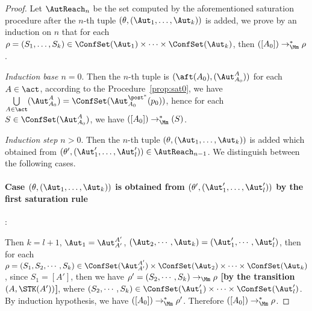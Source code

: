 \begin{proof}
    Let $\AutReach_n$ be the set computed by the aforementioned saturation procedure after the $n$-th tuple $(\theta,(\Aut_1,\dots,\Aut_k))$ is added, we prove by an induction on $n$ that for each $\rho = (S_1,\dots,S_k)\in\ConfSet(\Aut_1) \times \dots \times \ConfSet(\Aut_k)$, then $([A_0])\rightarrow_{\Mm}^*\rho$.

    \noindent \emph{Induction base $n = 0$}. Then the $n$-th tuple is $(\aft(A_0),(\Aut_{A_0}^{A}))$ for each $A\in\act$, according to the Procedure~\ref{prop:sat0}, we have $\bigcup\limits_{A\in\act}(\Aut_{A_0}^{A}) = \ConfSet(\Aut_{A_0}^{\post^*}(p_0))$, hence for each $S\in\ConfSet(\Aut_{A_0}^A)$, we have $([A_0])\rightarrow_{\Mm}^*(S)$.

\smallskip

\noindent \emph{Induction step $n > 0$}. Then the $n$-th tuple $(\theta,(\Aut_1,\dots,\Aut_k))$ is added which obtained from $(\theta',(\Aut_1',\dots,\Aut_l'))\in\AutReach_{n-1}$.
We distinguish between the following cases.

\paragraph{Case $(\theta,(\Aut_1,\dots,\Aut_k))$ is obtained from $(\theta',(\Aut_1',\dots,\Aut_l'))$ by the first saturation rule} :

Then $k = l+1$, $\Aut_1 = \Aut_{A'}^{A'}$, $(\Aut_2,\cdots,\Aut_k) = (\Aut_1',\cdots,\Aut_l')$, 
then for each $\rho=(S_1,S_2,\cdots,S_k)\in\ConfSet(\Aut_{A'}^{A'})\times\ConfSet(\Aut_2)\times\cdots\times\ConfSet(\Aut_k)$,
since $S_1=[A']$, then we have $\rho' = (S_2,\cdots,S_k)\rightarrow_{\Mm}\rho$ \textbf{[by the transition $(A,\STK(A'))$]}, where $(S_2,\cdots,S_k)\in\ConfSet(\Aut_1')\times\cdots\times\ConfSet(\Aut_l')$.  By induction hypothesis, we have $([A_0])\rightarrow_{\Mm}^* \rho'$. Therefore $([A_0])\rightarrow_{\Mm}^*\rho$.

\end{proof}
